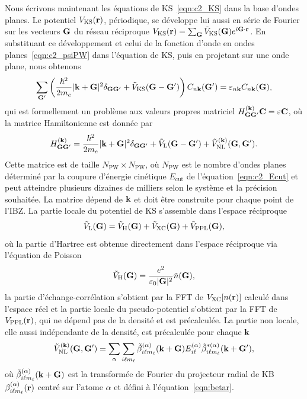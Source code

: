 Nous écrivons maintenant les équations de KS~\eqref{eqn:c2_KS} dans la base d'ondes planes. Le potentiel $V_\text{KS}(\mathbf{r})$, périodique, se développe lui aussi en série de Fourier sur les vecteurs $\mathbf{G}$ du réseau réciproque $V_\text{KS}(\mathbf{r})=\sum_{\mathbf{G}} \tilde V_\text{KS}(\mathbf{G})e^{i\mathbf{G}\cdot\mathbf{r}}$. En substituant ce développement et celui de la fonction d'onde en ondes planes~\eqref{eqn:c2_psiPW} dans l'équation de KS, puis en projetant sur une onde plane, nous obtenons
\begin{equation}
    \sum_{\mathbf{G}'}\left(\frac{\hbar^2}{2m_e}|\mathbf{k}+\mathbf{G}|^2\delta_{\mathbf{G}\mathbf{G}'}+\tilde{V}_\text{KS}(\mathbf{G}-\mathbf{G}')\right)C_{n\mathbf{k}}(\mathbf{G}')=\varepsilon_{n\mathbf{k}}C_{n\mathbf{k}}(\mathbf{G}),
    \label{eqn:c2_KSPW}
\end{equation}
qui est formellement un problème aux valeurs propres matriciel $H^{(\mathbf{k})}_{\mathbf{G}\mathbf{G}'}\mathbf{C}=\varepsilon\mathbf{C}$, où la matrice Hamiltonienne est donnée par
\begin{equation}
    H^{(\mathbf{k})}_{\mathbf{G}\mathbf{G}'}=\frac{\hbar^2}{2m_e}|\mathbf{k}+\mathbf{G}|^2\delta_{\mathbf{G}\mathbf{G}'}+\tilde{V}_\text{L}(\mathbf{G}-\mathbf{G}')+\tilde{V}^{(\mathbf{k})}_\text{NL}(\mathbf{G},\mathbf{G}').
    \label{eqn:c2_HGG}
\end{equation}
Cette matrice est de taille $N_\text{PW}\times N_\text{PW}$, où $N_\text{PW}$ est le nombre d'ondes planes déterminé par la coupure d'énergie cinétique $E_\text{cut}$ de l'équation~\eqref{eqn:c2_Ecut} et peut atteindre plusieurs dizaines de milliers selon le système et la précision souhaitée. La matrice dépend de $\mathbf{k}$ et doit être construite pour chaque point de l'IBZ. La partie locale du potentiel de KS s'assemble dans l'espace réciproque
\begin{equation}
    \tilde{V}_\text{L}(\mathbf{G}) = \tilde{V}_\text{H}(\mathbf{G})+\tilde{V}_\text{XC}(\mathbf{G})+\tilde{V}_\text{PPL}(\mathbf{G}),
\end{equation}
où la partie d'Hartree est obtenue directement dans l'espace réciproque via l'équation de Poisson
\begin{equation}
    \tilde{V}_\text{H}(\mathbf{G}) = \frac{e^2}{\varepsilon_0|\mathbf{G}|^2}\tilde{n}(\mathbf{G}),
\end{equation}
la partie d'échange-corrélation s'obtient par la FFT de $V_\text{XC}[n(\mathbf{r})]$ calculé dans l'espace réel et la partie locale du pseudo-potentiel s'obtient par la FFT de $V_\text{PPL}(\mathbf{r})$, qui ne dépend pas de la densité et est précalculée. La partie non locale, elle aussi indépendante de la densité, est précalculée pour chaque $\mathbf{k}$
\begin{equation}
    \tilde{V}_\text{NL}^{(\mathbf{k})}(\mathbf{G},\mathbf{G}') = \sum_\alpha\sum_{i\ell m_\ell}\tilde{\beta}_{i\ell m_\ell}^{(\alpha)}(\mathbf{k}+\mathbf{G})E_{i\ell}^{(\alpha)}\tilde{\beta}^{*(\alpha)}_{i\ell m_\ell}(\mathbf{k}+\mathbf{G}'),\label{eqn:V_NL_k}
\end{equation}
où $\tilde{\beta}_{i\ell m_\ell}^{(\alpha)}(\mathbf{k}+\mathbf{G})$ est la transformée de Fourier du projecteur radial de KB $\beta_{i\ell m_\ell}^{(\alpha)}(\mathbf{r})$ centré sur l'atome $\alpha$ et défini à l'équation~\eqref{eqn:betar}.

